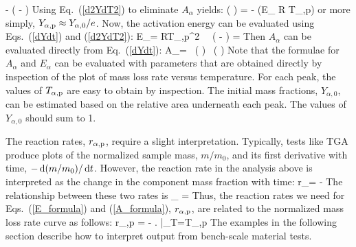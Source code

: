 \documentclass[11pt]{book}
\begin{document}
   \approx -  \; \exp \left( - \right)
\ee
Using Eq.~(\ref{d2YdT2}) to eliminate $A_\alpha$ yields:
\be
   \ln \left(  \right) = -    \quad \quad (E_\alpha {} R T_{\alpha,{\rm p}})
\ee
or more simply, $Y_{\alpha,{\rm p}} \approx Y_{\alpha,0}/e$. Now, the activation energy can be evaluated using Eqs.~(\ref{dYdt}) and (\ref{d2YdT2}):
\be
   E_\alpha = RT_{\alpha,{\rm p}}^2 \,  \, \exp \left( - \right) =  
   \approx {}   \label{E_formula}
\ee
Then $A_\alpha$ can be evaluated directly from Eq.~(\ref{dYdt}):
\be
   A_\alpha =  \, \exp \left(  \right) \approx {} \, \exp \left(  \right) \label{A_formula}
\ee
Note that the formulae for $A_\alpha$ and $E_\alpha$ can be evaluated with parameters that are obtained directly by inspection of the plot of mass loss rate versus temperature. For each peak, the values of $T_{\alpha,{\rm p}}$ are easy to obtain by inspection. The initial mass fractions, $Y_{\alpha,0}$, can be estimated based on the relative area underneath each peak. The values of $Y_{\alpha,0}$ should sum to 1.

The reaction rates, $r_{\alpha,{\rm p}}$, require a slight interpretation. Typically, tests like TGA produce plots of the normalized sample mass, $m/m_0$, and its first derivative with time, $-\,\mathrm{d} (m/m_0) /\,\mathrm{d} t$. However, the reaction rate in the analysis above is interpreted as the change in the component mass fraction with time:
\be
   r_\alpha = - 
\ee
The relationship between these two rates is
\be
   \sum_\alpha {} =  
\ee
Thus, the reaction rates we need for Eqs.~(\ref{E_formula}) and (\ref{A_formula}), $r_{\alpha,{\rm p}}$, are related to the normalized mass loss rate curve as follows:
\be
   r_{\alpha,{\rm p}} = -  \left.  \right|_{T=T_{\alpha,{\rm p}}}
   \label{rr_calc}
\ee
The examples in the following section describe how to interpret output from bench-scale material tests.
\end{document}
